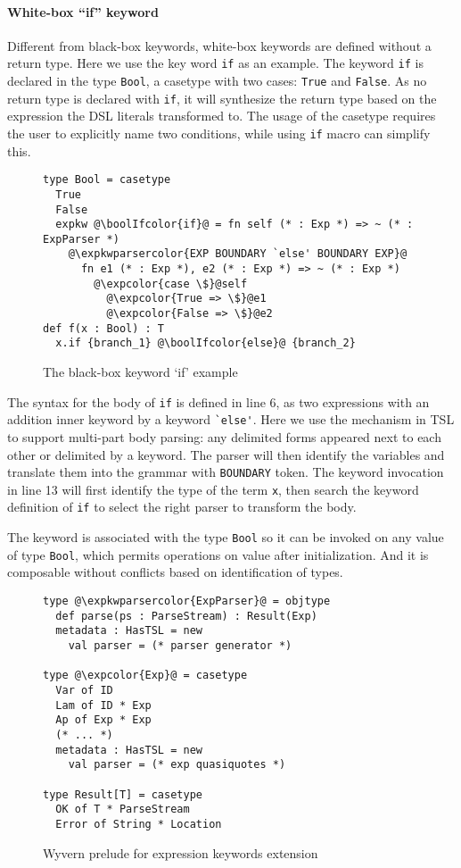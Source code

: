 \documentclass{sig-alternate}
\newcommand{\expkwparsercolor}[1]{\textcolor[HTML]{336699}{#1}}
\newcommand{\expcolor}[1]{\textcolor[HTML]{FF0033}{#1}}
\newcommand{\boolIfcolor}[1]{\textcolor[HTML]{5E0C0C}{#1}}
\newcommand{\mycaption}[1]{\vspace{-4px}\caption{#1}\vspace{-2px}}
\begin{document}
\paragraph{White-box ``if'' keyword}
Different from black-box keywords, white-box keywords are defined without a return type. Here we use the key word \verb|if| as an example. The keyword \verb|if| is declared in the type \verb|Bool|, a casetype with two cases: \verb|True| and \verb|False|. As no return type is declared with \verb|if|, it will synthesize the return type based on the expression the DSL literals transformed to. The usage of the casetype requires the user to explicitly name two conditions, while using \verb|if| macro can simplify this.
\begin{figure}[ht]
\begin{lstlisting}[style=wyvern]
type Bool = casetype 
  True
  False
  expkw @\boolIfcolor{if}@ = fn self (* : Exp *) => ~ (* : ExpParser *)
    @\expkwparsercolor{EXP BOUNDARY `else' BOUNDARY EXP}@
      fn e1 (* : Exp *), e2 (* : Exp *) => ~ (* : Exp *)
        @\expcolor{case \$}@self
          @\expcolor{True => \$}@e1
          @\expcolor{False => \$}@e2
def f(x : Bool) : T
  x.if {branch_1} @\boolIfcolor{else}@ {branch_2}
\end{lstlisting}
\mycaption{The black-box keyword `if' example\todo{color quotations}}
\label{if-example}
\end{figure}

The syntax for the body of \verb|if| is defined in line 6, as two expressions with an addition inner keyword by a keyword \verb|`else'|. Here we use the mechanism in TSL to support multi-part body parsing: any delimited forms appeared next to each other or delimited by a keyword. The parser will then identify the variables and translate them into the grammar with \verb|BOUNDARY| token. The keyword invocation in line 13 will first identify the type of the term \verb|x|, then search the keyword definition of \verb|if| to select the right parser to transform the body. 

The keyword is associated with the type \verb|Bool| so it can be invoked on any value of type \verb|Bool|, which permits operations on value after initialization. And it is composable without conflicts based on identification of types. 

\begin{figure}[ht!]
\begin{lstlisting}[style=wyvern]
type @\expkwparsercolor{ExpParser}@ = objtype
  def parse(ps : ParseStream) : Result(Exp)
  metadata : HasTSL = new 
    val parser = (* parser generator *)

type @\expcolor{Exp}@ = casetype
  Var of ID
  Lam of ID * Exp
  Ap of Exp * Exp
  (* ... *)
  metadata : HasTSL = new
    val parser = (* exp quasiquotes *)

type Result[T] = casetype
  OK of T * ParseStream
  Error of String * Location
\end{lstlisting}
\mycaption{Wyvern prelude for expression keywords extension}
\end{figure}
\end{document}

